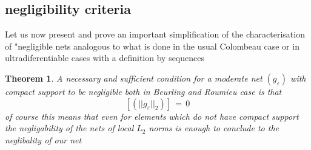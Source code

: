 \documentclass[12pt,a4paper]{amsart}
\newtheorem{theorem}{Theorem}[section]
\begin{document}
  \subsection{negligibility criteria}
  
  
   
   Let us now present and prove an important simplification of the characterisation of "negligible nets analogous to what is done in the usual Colombeau case or in ultradiferentiable cases with a definition by sequences \cite{D.V.V.}
   
   \begin{theorem}
 A necessary and sufficient condition for a moderate net 
 $(g_\varepsilon)$ with compact support to be negligible both in  Beurling and Roumieu case is that 
 $$ [(||g_\varepsilon||_2)] \,=\,0$$
 of course this means that even for elements which do not have compact support the negligability of the nets of local $L_2$ norms is enough to conclude to the neglibality of our net 
 \end{theorem}
   
\end{document}
